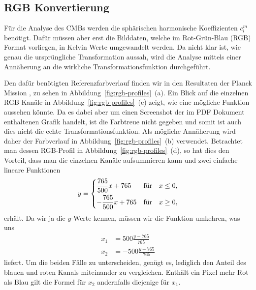 \subsection{RGB Konvertierung}

Für die Analyse des CMBs werden die sphärischen harmonische Koeffizienten 
$c_l^m$ benötigt. Dafür müssen aber erst die Bilddaten, welche im Rot-Grün-Blau 
(RGB) Format vorliegen, in Kelvin Werte umgewandelt werden. Da nicht klar ist, 
wie genau die ursprüngliche Transformation aussah, wird die Analyse mittels 
einer Annäherung an die wirkliche Transformationsfunktion durchgeführt.

Den dafür benötigten Referenzfarbverlauf finden wir in den Resultaten der 
Planck Mission \cite{cmb:planck_overview}, zu sehen in 
Abbildung~\ref{fig:rgb-profiles}~(a). Ein Blick auf die einzelnen RGB 
Kanäle in Abbildung~\ref{fig:rgb-profiles}~(c) zeigt, wie eine mögliche 
Funktion aussehen könnte. Da es dabei aber um einen Screenshot 
der im PDF Dokument enthaltenen Grafik handelt, ist die Farbtreue nicht gegeben 
und somit ist auch dies nicht die echte Transformationsfunktion. Als mögliche 
Annäherung wird daher der Farbverlauf in Abbildung~\ref{fig:rgb-profiles}~(b) 
verwendet. Betrachtet man dessen RGB-Profil in 
Abbildung~\ref{fig:rgb-profiles}~(d), so hat dies den Vorteil, dass man die 
einzelnen Kanäle aufsummieren kann und zwei einfache lineare Funktionen
\begin{equation*}
	y =
	\begin{dcases}
		\frac{765}{500}x + 765 & \text{für} \quad x \leq 0,\\
		-\frac{765}{500}x + 765 & \text{für} \quad x \geq 0,\\
	\end{dcases}
\end{equation*}
erhält. Da wir ja die $y$-Werte kennen, müssen wir die Funktion umkehren, 
was uns
\begin{align*}
	x_1 &= 500\frac{y - 765}{765}\\
	x_2 &= -500\frac{y - 765}{765}
\end{align*}
liefert. Um die beiden Fälle zu unterscheiden, genügt es, lediglich den Anteil 
des blauen und roten Kanals miteinander zu vergleichen. Enthält ein Pixel mehr 
Rot als Blau gilt die Formel für $x_2$ andernfalls diejenige für $x_1$.

